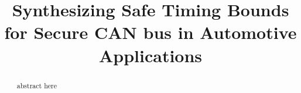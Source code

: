 \documentclass[sigconf]{acmart}
\begin{document}
\title{Synthesizing Safe Timing Bounds for Secure CAN bus in Automotive Applications}


\author{} %



\renewcommand{\shortauthors}{}


\begin{abstract}
abstract here
\end{abstract}



%
%




\maketitle






\end{document}
